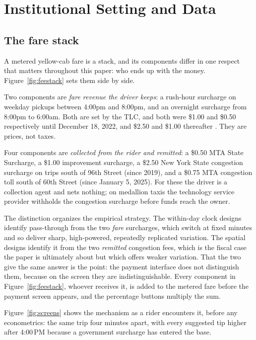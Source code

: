 \section{Institutional Setting and Data}
\label{sec:empirical-facts}

\subsection{The fare stack}
A metered yellow-cab fare is a stack, and its components differ in one
respect that matters throughout this paper: who ends up with the money.
Figure~\ref{fig:feestack} sets them side by side.

Two components are \emph{fare revenue the driver keeps}: a rush-hour
surcharge on weekday pickups between 4:00pm and 8:00pm, and an overnight
surcharge from 8:00pm to 6:00am. Both are set by the TLC, and both were
\$1.00 and \$0.50 respectively until December 18, 2022, and \$2.50 and
\$1.00 thereafter \parencite{tlc2022notice}. They are prices, not taxes.

Four components are \emph{collected from the rider and remitted}: a
\$0.50 MTA State Surcharge, a \$1.00 improvement surcharge, a \$2.50 New
York State congestion surcharge on trips south of 96th Street (since
2019), and a \$0.75 MTA congestion toll south of 60th Street (since
January 5, 2025). For these the driver is a collection agent and nets
nothing; on medallion taxis the technology service provider withholds
the congestion surcharge before funds reach the owner.

The distinction organizes the empirical strategy. The within-day clock
designs identify pass-through from the two \emph{fare} surcharges, which
switch at fixed minutes and so deliver sharp, high-powered, repeatedly
replicated variation. The spatial designs identify it from the two
\emph{remitted} congestion fees, which is the fiscal case the paper is
ultimately about but which offers weaker variation. That the two give
the same answer is the point: the payment interface does not distinguish
them, because on the screen they are indistinguishable. Every component
in Figure~\ref{fig:feestack}, whoever receives it, is added to the
metered fare before the payment screen appears, and the percentage
buttons multiply the sum.

Figure~\ref{fig:screens} shows the mechanism as a rider encounters it,
before any econometrics: the same trip four minutes apart, with every
suggested tip higher after 4:00\,PM because a government surcharge has
entered the base.

